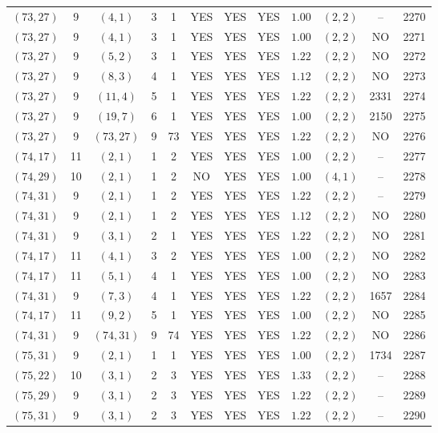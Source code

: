 \begin{longtable}{|c|c|c|c|c|c|c|c|c|c|c|c|}
$(73,27)$ & 9 & $(4,1)$ & 3 & 1 & YES & YES & YES & $1.00$ & $(2,2)$ & -- & 2270\\
$(73,27)$ & 9 & $(4,1)$ & 3 & 1 & YES & YES & YES & $1.00$ & $(2,2)$ & NO & 2271\\
$(73,27)$ & 9 & $(5,2)$ & 3 & 1 & YES & YES & YES & $1.22$ & $(2,2)$ & NO & 2272\\
$(73,27)$ & 9 & $(8,3)$ & 4 & 1 & YES & YES & YES & $1.12$ & $(2,2)$ & NO & 2273\\
$(73,27)$ & 9 & $(11,4)$ & 5 & 1 & YES & YES & YES & $1.22$ & $(2,2)$ & 2331 & 2274\\
$(73,27)$ & 9 & $(19,7)$ & 6 & 1 & YES & YES & YES & $1.00$ & $(2,2)$ & 2150 & 2275\\
$(73,27)$ & 9 & $(73,27)$ & 9 & 73 & YES & YES & YES & $1.22$ & $(2,2)$ & NO & 2276\\
$(74,17)$ & 11 & $(2,1)$ & 1 & 2 & YES & YES & YES & $1.00$ & $(2,2)$ & -- & 2277\\
$(74,29)$ & 10 & $(2,1)$ & 1 & 2 & NO & YES & YES & $1.00$ & $(4,1)$ & -- & 2278\\
$(74,31)$ & 9 & $(2,1)$ & 1 & 2 & YES & YES & YES & $1.22$ & $(2,2)$ & -- & 2279\\
$(74,31)$ & 9 & $(2,1)$ & 1 & 2 & YES & YES & YES & $1.12$ & $(2,2)$ & NO & 2280\\
$(74,31)$ & 9 & $(3,1)$ & 2 & 1 & YES & YES & YES & $1.22$ & $(2,2)$ & NO & 2281\\
$(74,17)$ & 11 & $(4,1)$ & 3 & 2 & YES & YES & YES & $1.00$ & $(2,2)$ & NO & 2282\\
$(74,17)$ & 11 & $(5,1)$ & 4 & 1 & YES & YES & YES & $1.00$ & $(2,2)$ & NO & 2283\\
$(74,31)$ & 9 & $(7,3)$ & 4 & 1 & YES & YES & YES & $1.22$ & $(2,2)$ & 1657 & 2284\\
$(74,17)$ & 11 & $(9,2)$ & 5 & 1 & YES & YES & YES & $1.00$ & $(2,2)$ & NO & 2285\\
$(74,31)$ & 9 & $(74,31)$ & 9 & 74 & YES & YES & YES & $1.22$ & $(2,2)$ & NO & 2286\\
$(75,31)$ & 9 & $(2,1)$ & 1 & 1 & YES & YES & YES & $1.00$ & $(2,2)$ & 1734 & 2287\\
$(75,22)$ & 10 & $(3,1)$ & 2 & 3 & YES & YES & YES & $1.33$ & $(2,2)$ & -- & 2288\\
$(75,29)$ & 9 & $(3,1)$ & 2 & 3 & YES & YES & YES & $1.22$ & $(2,2)$ & -- & 2289\\
$(75,31)$ & 9 & $(3,1)$ & 2 & 3 & YES & YES & YES & $1.22$ & $(2,2)$ & -- & 2290\\

\end{longtable}
